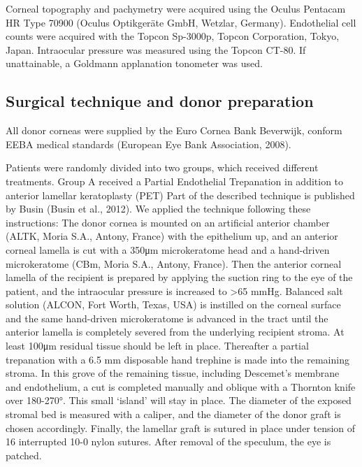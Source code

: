 \documentclass[authordate, empirical]{jote-new-article}
\begin{document}
	Corneal topography and pachymetry were acquired using the Oculus Pentacam HR Type 70900 (Oculus Optikgeräte GmbH, Wetzlar, Germany). Endothelial cell counts were acquired with the Topcon Sp-3000p, Topcon Corporation, Tokyo, Japan. Intraocular pressure was measured using the Topcon CT-80. If unattainable, a Goldmann applanation tonometer was used.



	\subsection{Surgical technique and donor preparation}



	All donor corneas were supplied by the Euro Cornea Bank Beverwijk, conform EEBA medical standards (European Eye Bank Association, 2008).



	Patients were randomly divided into two groups, which received different treatments. Group A received a Partial Endothelial Trepanation in addition to anterior lamellar keratoplasty (PET) Part of the described technique is published by Busin (Busin et al., 2012).\textsuperscript{ }We applied the technique following these instructions: The donor cornea is mounted on an artificial anterior chamber (ALTK, Moria S.A., Antony, France) with the epithelium up, and an anterior corneal lamella is cut with a 350μm microkeratome head and a hand-driven microkeratome (CBm, Moria S.A., Antony, France). Then the anterior corneal lamella of the recipient is prepared by applying the suction ring to the eye of the patient, and the intraocular pressure is increased to >65 mmHg. Balanced salt solution (ALCON, Fort Worth, Texas, USA) is instilled on the corneal surface and the same hand-driven microkeratome is advanced in the tract until the anterior lamella is completely severed from the underlying recipient stroma. At least 100μm residual tissue should be left in place. Thereafter a partial trepanation with a 6.5 mm disposable hand trephine is made into the remaining stroma. In this grove of the remaining tissue, including Descemet's membrane and endothelium, a cut is completed manually and oblique with a Thornton knife over 180-270°. This small ‘island' will stay in place. The diameter of the exposed stromal bed is measured with a caliper, and the diameter of the donor graft is chosen accordingly. Finally, the lamellar graft is sutured in place under tension of 16 interrupted 10-0 nylon sutures. After removal of the speculum, the eye is patched.
\end{document}

